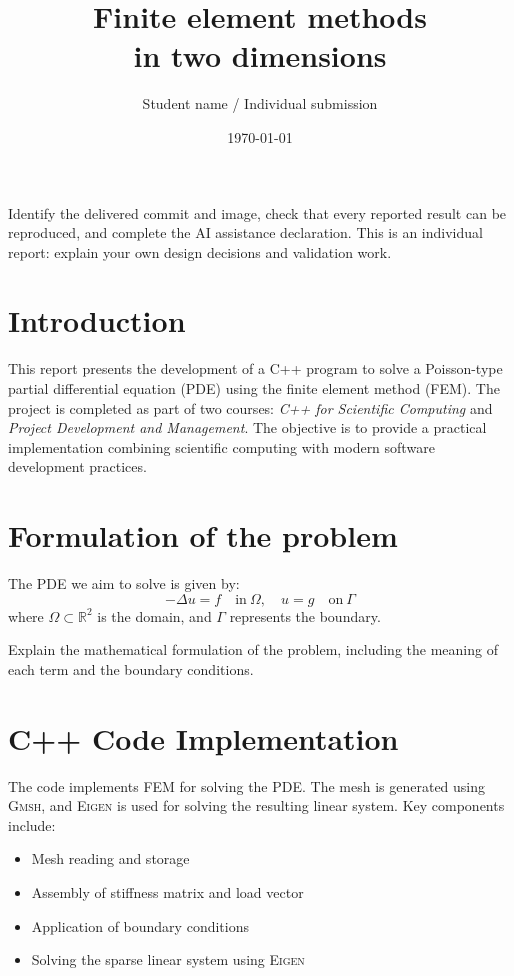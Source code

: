 \documentclass[11pt,a4paper]{article}
\title{Finite element methods\\in two dimensions}
\author{Student name / Individual submission}
\date{\today}
\begin{document}
\maketitle

\begin{csminote}
Identify the delivered commit and image, check that every reported result can be
reproduced, and complete the AI assistance declaration. This is an individual
report: explain your own design decisions and validation work.
\end{csminote}
\tableofcontents
\clearpage

\section{Introduction}
\label{sec:introduction}
This report presents the development of a C++ program to solve a Poisson-type partial differential equation (PDE) using the finite element method (FEM). The project is completed as part of two courses: \textit{C++ for Scientific Computing} and \textit{Project Development and Management}. The objective is to provide a practical implementation combining scientific computing with modern software development practices.

\section{Formulation of the problem}
\label{sec:mathematical_formulation}
The PDE we aim to solve is given by:
\[
-\Delta u = f \quad \text{in} \ \Omega, \quad u = g \quad \text{on} \ \Gamma
\]
where $\Omega \subset \mathbb{R}^2$ is the domain, and $\Gamma$ represents the boundary.

Explain the mathematical formulation of the problem, including the meaning of each term and the boundary conditions.

\section{C++ Code Implementation}
\label{sec:cpp_implementation}
The code implements FEM for solving the PDE. The mesh is generated using \textsc{Gmsh}, and \textsc{Eigen} is used for solving the resulting linear system. Key components include:
\begin{itemize}
    \item Mesh reading and storage
    \item Assembly of stiffness matrix and load vector
    \item Application of boundary conditions
    \item Solving the sparse linear system using \textsc{Eigen}
\end{itemize}
\end{document}
